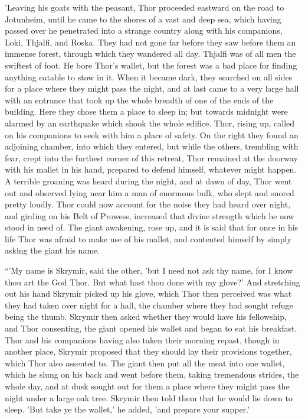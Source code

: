 'Leaving his goats with the peasant, Thor proceeded eastward on the
road to Jotunheim, until he came to the shores of a vast and deep sea,
which having passed over he penetrated into a strange country along
with his companions, Loki, Thjalfi, and Roska. They had not gone far
before they saw before them an immense forest, through which they
wandered all day. Thjalfi was of all men the swiftest of foot. He bore
Thor's wallet, but the forest was a bad place for finding anything
eatable to stow in it. When it became dark, they searched on all sides
for a place where they might pass the night, and at last came to a
very large hall with an entrance that took up the whole breadth of one
of the ends of the building. Here they chose them a place to sleep in;
but towards midnight were alarmed by an earthquake which shook the
whole edifice. Thor, rising up, called on his companions to seek with
him a place of safety. On the right they found an adjoining chamber,
into which they entered, but while the others, trembling with fear,
crept into the furthest corner of this retreat, Thor remained at the
doorway with his mallet in his hand, prepared to defend himself,
whatever might happen. A terrible groaning was heard during the night,
and at dawn of day, Thor went out and observed lying near him a man of
enormous bulk, who slept and snored pretty loudly. Thor could now
account for the noise they had heard over night, and girding on his
Belt of Prowess, increased that divine strength which he now stood in
need of. The giant awakening, rose up, and it is said that for once in
his life Thor was afraid to make use of his mallet, and contented
himself by simply asking the giant his name.

``'My name is Skrymir, said the other, 'but I need not ask thy name,
for I know thou art the God Thor. But what hast thou done with my
glove?' And stretching out his hand Skrymir picked up his glove, which
Thor then perceived was what they had taken over night for a hall, the
chamber where they had sought refuge being the thumb. Skrymir then
asked whether they would have his fellowship, and Thor consenting, the
giant opened his wallet and began to eat his breakfast. Thor and his
companions having also taken their morning repast, though in another
place, Skrymir proposed that they should lay their provisions
together, which Thor also assented to. The giant then put all the meat
into one wallet, which he slung on his back and went before them,
taking tremendous strides, the whole day, and at dusk sought out for
them a place where they might pass the night under a large oak tree.
Skrymir then told them that he would lie down to sleep. 'But take ye
the wallet,' he added, 'and prepare your supper.'

